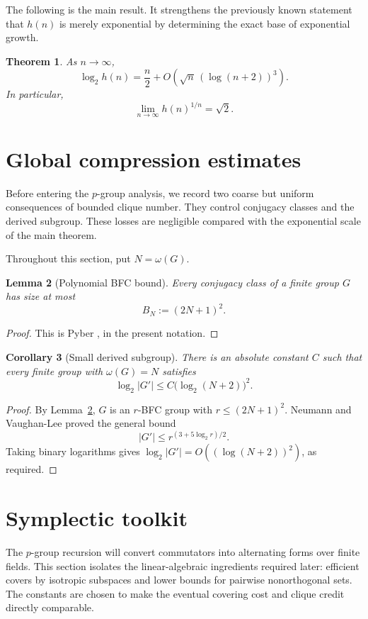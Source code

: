 \documentclass[11pt]{article}
\newtheorem{theorem}{Theorem}[section]
\newtheorem{lemma}[theorem]{Lemma}
\newtheorem{corollary}[theorem]{Corollary}
\theoremstyle{definition}
\theoremstyle{remark}
\begin{document}
The following is the main result. It strengthens the previously known statement that $h(n)$ is merely exponential by determining the exact base of exponential growth.

\begin{theorem}\label{thm:main}
As $n\to\infty$,
\[
\log_2 h(n)=\frac n2+O\!\left(\sqrt n\,(\log(n+2))^3\right).
\]
In particular,
\[
\lim_{n\to\infty} h(n)^{1/n}=\sqrt2.
\]
\end{theorem}

\section{Global compression estimates}

Before entering the $p$-group analysis, we record two coarse but uniform consequences of bounded clique number. They control conjugacy classes and the derived subgroup. These losses are negligible compared with the exponential scale of the main theorem.

Throughout this section, put $N=\omega(G)$.

\begin{lemma}[Polynomial BFC bound]\label{lem:bfc}
Every conjugacy class of a finite group $G$ has size at most
\[
B_N:=(2N+1)^2.
\]
\end{lemma}

\begin{proof}
This is Pyber \cite[Lemma 3.1]{Pyber1987}, in the present notation.
\end{proof}

\begin{corollary}[Small derived subgroup]\label{cor:derived}
There is an absolute constant $C$ such that every finite group with $\omega(G)=N$ satisfies
\[
\log_2|G'|\le C\bigl(\log_2(N+2)\bigr)^2.
\]
\end{corollary}

\begin{proof}
By Lemma~\ref{lem:bfc}, $G$ is an $r$-BFC group with $r\le(2N+1)^2$. Neumann and Vaughan-Lee \cite{NeumannVaughanLee1977} proved the general bound
\[
|G'|\le r^{(3+5\log_2 r)/2}.
\]
Taking binary logarithms gives $\log_2|G'|=O((\log(N+2))^2)$, as required.
\end{proof}

\section{Symplectic toolkit}

The $p$-group recursion will convert commutators into alternating forms over finite fields. This section isolates the linear-algebraic ingredients required later: efficient covers by isotropic subspaces and lower bounds for pairwise nonorthogonal sets. The constants are chosen to make the eventual covering cost and clique credit directly comparable.
\end{document}
